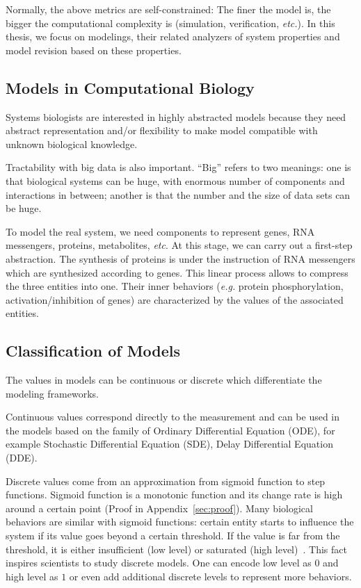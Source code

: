 Normally, the above metrics are self-constrained:
The finer the model is, the bigger the computational complexity is (simulation, verification, \textit{etc.}).
In this thesis, we focus on modelings, their related analyzers of system properties and model revision based on these properties.

\subsection{Models in Computational Biology}
Systems biologists are interested in highly abstracted models because they need abstract representation and/or flexibility to make model compatible with unknown biological knowledge.

Tractability with big data is also important.
``Big'' refers to two meanings: one is that biological systems can be huge, with enormous number of components and interactions in between; another is that the number and the size of data sets can be huge.

To model the real system, we need components to represent genes, RNA messengers, proteins, metabolites, \textit{etc}.
At this stage, we can carry out a first-step abstraction.
The synthesis of proteins is under the instruction of RNA messengers which are synthesized according to genes.
This linear process allows  to compress the three entities into one.
Their inner behaviors (\textit{e.g.} protein phosphorylation, activation/inhibition of genes) are characterized by the values of the associated entities.

\subsection{Classification of Models}

The values in models can be continuous or discrete which differentiate the modeling frameworks.

Continuous %
 values correspond directly to the measurement and can be used in the models based on the family of Ordinary Differential Equation (ODE), for example Stochastic Differential Equation (SDE), Delay Differential Equation (DDE).

Discrete values come from an approximation from sigmoid function to step functions. 
Sigmoid function is a monotonic function and its change rate is high around a certain point (Proof in Appendix~\ref{sec:proof}).
Many biological behaviors are similar with sigmoid functions: certain entity starts to influence the system if its value goes beyond a certain threshold.
If the value is far from the threshold, it is either insufficient (low level) or saturated (high level)~\cite{kauffman1969,von2000segment}.
This fact inspires scientists to study discrete models.
One can encode low level as $0$ and high level as $1$ or even add additional discrete levels to represent more behaviors.

